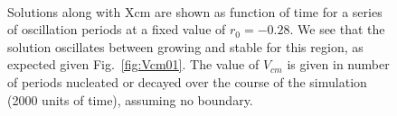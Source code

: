\documentclass[pre,preprint,superscriptaddress]{revtex4-1}
\begin{document}
 \begin{figure}[!htb]
  \begin{center}
    \mbox{
      	\quad 
      } \mbox{
      	\quad 
      }
    \caption{Solutions along with Xcm are shown as  function of time for a series of oscillation periods at a fixed value of $r_0=-0.28$.  We see that the solution oscillates between growing and stable for this region, as expected given Fig.~\ref{fig:Vcm01}.  The value of $V_{cm}$ is given in number of periods nucleated or decayed over the course of the simulation (2000 units of time), assuming no boundary.}
    \label{fig:r28slice1}
  \end{center}
\end{figure} 
\end{document}
